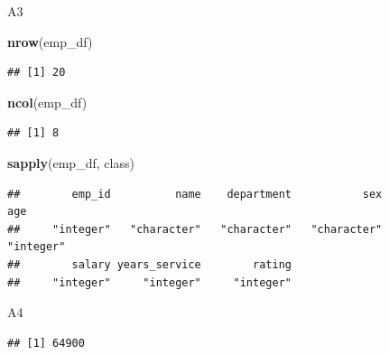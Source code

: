 \documentclass[
]{article}
\newenvironment{Shaded}{\begin{snugshade}}{\end{snugshade}}
\newcommand{\FunctionTok}[1]{\textcolor[rgb]{0.13,0.29,0.53}{\textbf{#1}}}
\newcommand{\NormalTok}[1]{#1}
\newcommand{\SpecialCharTok}[1]{\textcolor[rgb]{0.81,0.36,0.00}{\textbf{#1}}}
\begin{document}
A3

\begin{Shaded}
\begin{Highlighting}[]
\FunctionTok{nrow}\NormalTok{(emp\_df)}
\end{Highlighting}
\end{Shaded}

\begin{verbatim}
## [1] 20
\end{verbatim}

\begin{Shaded}
\begin{Highlighting}[]
\FunctionTok{ncol}\NormalTok{(emp\_df)}
\end{Highlighting}
\end{Shaded}

\begin{verbatim}
## [1] 8
\end{verbatim}

\begin{Shaded}
\begin{Highlighting}[]
\FunctionTok{sapply}\NormalTok{(emp\_df, class)}
\end{Highlighting}
\end{Shaded}

\begin{verbatim}
##        emp_id          name    department           sex           age 
##     "integer"   "character"   "character"   "character"     "integer" 
##        salary years_service        rating 
##     "integer"     "integer"     "integer"
\end{verbatim}

A4

\begin{Shaded}
\end{Shaded}

\begin{verbatim}
## [1] 64900
\end{verbatim}

\begin{Shaded}
\end{Shaded}
\end{document}
